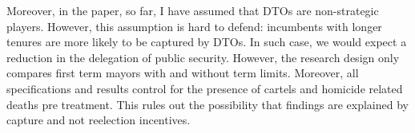 \documentclass[12pt]{amsart}
\makeatletter
\def\subsection{\@startsection{subsection}{2}
	\z@{.8\linespacing\@plus.7\linespacing}{.7\linespacing}{\large}}
\numberwithin{equation}{section}
\theoremstyle{definition}
\theoremstyle{definition}
\theoremstyle{definition}
\makeatother
\begin{document}
Moreover, in the paper, so far, I have assumed that DTOs are non-strategic players. However, this assumption is hard to defend: incumbents with longer tenures are more likely to be captured by DTOs. In such case, we would expect a reduction in the delegation of public security. However, the research design only compares first term mayors with and without term limits. Moreover, all specifications and results control for the presence of cartels and homicide related deaths pre treatment. This rules out the possibility that findings are explained by capture and not reelection incentives.  

\end{document}
